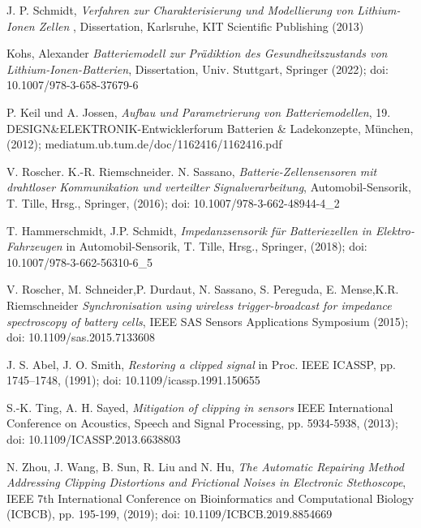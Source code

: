 \begin{thebibliography}{[99]}

	J. P. Schmidt, \textit{Verfahren zur Charakterisierung und Modellierung von Lithium-Ionen Zellen} , Dissertation, Karlsruhe, KIT Scientific Publishing (2013)
	
	Kohs, Alexander \textit{Batteriemodell zur Prädiktion des Gesundheitszustands von Lithium-Ionen-Batterien}, Dissertation, Univ. Stuttgart, Springer (2022); doi: 10.1007/978-3-658-37679-6
	
	P. Keil und A. Jossen, \textit{Aufbau und Parametrierung von Batteriemodellen}, 19. DESIGN\&ELEKTRONIK-Entwicklerforum Batterien \& Ladekonzepte, München, (2012); mediatum.ub.tum.de/doc/1162416/1162416.pdf
	
	V. Roscher. K.-R. Riemschneider. N. Sassano, \textit{Batterie-Zellensensoren mit drahtloser Kommunikation und verteilter Signalverarbeitung}, Automobil-Sensorik, T. Tille, Hrsg., Springer, (2016); doi: 10.1007/978-3-662-48944-4\_2
	
	T. Hammerschmidt, J.P. Schmidt, \textit{Impedanzsensorik für Batteriezellen in Elektro-Fahrzeugen} in Automobil-Sensorik, T. Tille, Hrsg., Springer, (2018); doi: 10.1007/978-3-662-56310-6\_5
	
	V. Roscher, M. Schneider,P.  Durdaut, N. Sassano, S. Pereguda, E. Mense,K.R. Riemschneider
	\textit{Synchronisation using wireless trigger-broadcast for impedance spectroscopy of battery cells},	IEEE SAS Sensors Applications Symposium (2015);	doi: 10.1109/sas.2015.7133608
	
	J. S. Abel, J. O. Smith, \textit{Restoring a clipped signal} in
	Proc. IEEE ICASSP, pp. 1745–1748, (1991); doi: 10.1109/icassp.1991.150655 
	
	S.-K. Ting, A. H. Sayed, \textit{Mitigation of clipping in sensors} IEEE International Conference on Acoustics, Speech and Signal Processing, pp. 5934-5938, (2013); doi: 10.1109/ICASSP.2013.6638803
	
	N. Zhou, J. Wang, B. Sun, R. Liu and N. Hu, \textit{The Automatic Repairing Method Addressing Clipping Distortions and Frictional Noises in Electronic Stethoscope}, IEEE 7th International Conference on Bioinformatics and Computational Biology (ICBCB), pp. 195-199, (2019); doi: 10.1109/ICBCB.2019.8854669
	

\end{thebibliography}
